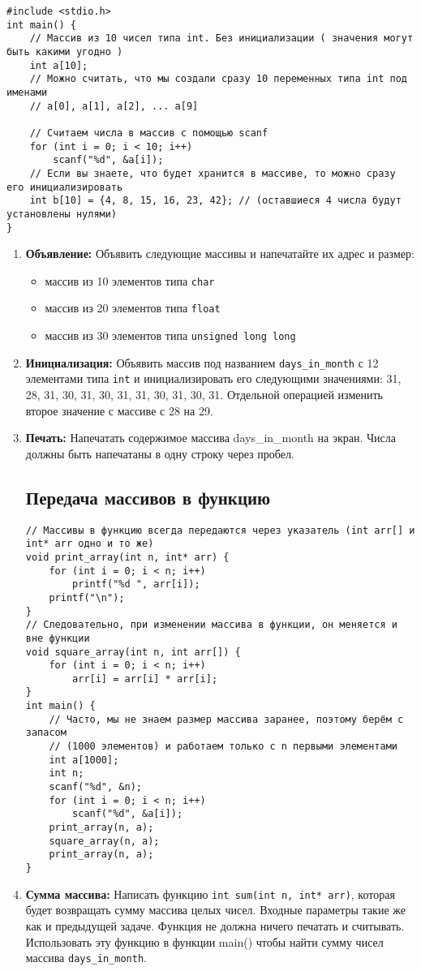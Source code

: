 \documentclass{article}
\begin{document}
\begin{lstlisting}
#include <stdio.h>
int main() {
	// Массив из 10 чисел типа int. Без инициализации ( значения могут быть какими угодно )
	int a[10];
	// Можно считать, что мы создали сразу 10 переменных типа int под именами
	// a[0], a[1], a[2], ... a[9]
	
	// Считаем числа в массив с помощью scanf
	for (int i = 0; i < 10; i++)
		scanf("%d", &a[i]);
	// Если вы знаете, что будет хранится в массиве, то можно сразу его инициализировать
	int b[10] = {4, 8, 15, 16, 23, 42}; // (оставшиеся 4 числа будут установлены нулями)
}
\end{lstlisting}
\begin{enumerate}
\item \textbf{Объявление:} Объявить следующие массивы и напечатайте их адрес и размер:
\begin{itemize}
\item массив из 10 элементов типа \texttt{char}
\item массив из 20 элементов типа \texttt{float}
\item массив из 30 элементов типа \texttt{unsigned long long}
\end{itemize}
\item \textbf{Инициализация:} Объявить массив под названием \texttt{days\_in\_month} с 12 элементами типа \texttt{int} и инициализировать его следующими значениями: 31, 28, 31, 30, 31, 30, 31, 31, 30, 31, 30, 31. Отдельной операцией изменить второе значение с массиве с 28 на 29.
\item \textbf{Печать:} Напечатать содержимое массива days\_in\_month на экран. Числа должны быть напечатаны в одну строку через пробел.


\subsection*{Передача массивов в функцию}
\begin{lstlisting}
// Массивы в функцию всегда передаются через указатель (int arr[] и int* arr одно и то же)
void print_array(int n, int* arr) {
	for (int i = 0; i < n; i++)
		printf("%d ", arr[i]);
	printf("\n");
}
// Следовательно, при изменении массива в функции, он меняется и вне функции
void square_array(int n, int arr[]) {
	for (int i = 0; i < n; i++)
		arr[i] = arr[i] * arr[i];
}
int main() {
	// Часто, мы не знаем размер массива заранее, поэтому берём с запасом 
	// (1000 элементов) и работаем только с n первыми элементами
	int a[1000];
	int n;
	scanf("%d", &n);
	for (int i = 0; i < n; i++)
		scanf("%d", &a[i]);
	print_array(n, a);
	square_array(n, a);
	print_array(n, a);
}
\end{lstlisting}
\item \textbf{Сумма массива:} Написать функцию \texttt{int sum(int n, int* arr)}, которая будет возвращать сумму массива целых чисел. Входные параметры такие же как и предыдущей задаче. Функция не должна ничего печатать и считывать. Использовать эту функцию в функции main() чтобы найти сумму чисел массива \texttt{days\_in\_month}.


\end{enumerate}
\end{document}
